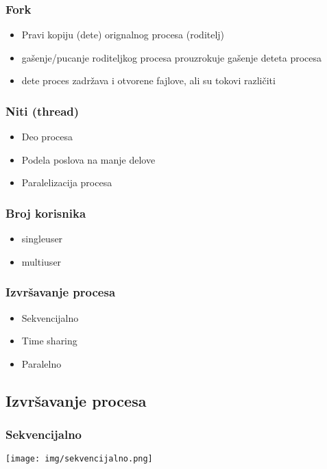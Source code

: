 \documentclass{beamer}
\begin{document}
\begin{frame}
    \frametitle{Fork}
    \begin{itemize}
        \item Pravi kopiju (dete) orignalnog procesa (roditelj) \newline
        \item gašenje/pucanje roditeljkog procesa prouzrokuje gašenje deteta procesa \newline
        \item dete proces zadržava i otvorene fajlove, ali su tokovi različiti
    \end{itemize}
\end{frame}

\begin{frame}
    \frametitle{Niti (thread)}
    \begin{itemize}
        \item Deo procesa \newline
        \item Podela poslova na manje delove \newline
        \item Paralelizacija procesa 
    \end{itemize}
\end{frame}

\begin{frame}
    \frametitle{Broj korisnika}
    \begin{itemize}
        \item singleuser \newline
        \item multiuser
    \end{itemize}
\end{frame}

\begin{frame}
    \frametitle{Izvršavanje procesa}
    \begin{itemize}
        \item Sekvencijalno \newline
        \item Time sharing \newline
        \item Paralelno
    \end{itemize}
\end{frame}

\subsection*{Izvršavanje procesa}
\begin{frame}
    \frametitle{Sekvencijalno}
    \begin{center}
        \texttt{[image: img/sekvencijalno.png]}
    \end{center}
\end{frame}
\end{document}
